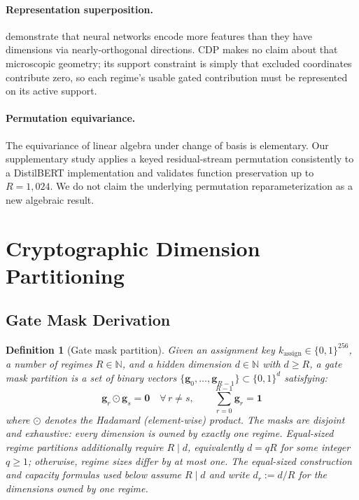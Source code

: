 \documentclass[11pt,a4paper]{article}
\newtheorem{definition}{Definition}
\newcommand{\N}{\mathbb{N}}
\newcommand{\bg}{\mathbf{g}}
\begin{document}
\paragraph{Representation superposition.}
\citet{elhage2022superposition} demonstrate that neural networks
encode more features than they have dimensions via nearly-orthogonal
directions.  CDP makes no claim about that microscopic geometry; its
support constraint is simply that excluded coordinates contribute
zero, so each regime's usable gated contribution must be represented
on its active support.

\paragraph{Permutation equivariance.}
The equivariance of linear algebra under change of basis is
elementary.  Our supplementary study applies a keyed residual-stream
permutation consistently to a DistilBERT implementation and validates
function preservation up to $R{=}1{,}024$.  We do not claim the
underlying permutation reparameterization as a new algebraic result.

\section{Cryptographic Dimension Partitioning}
\label{sec:cdp}

\subsection{Gate Mask Derivation}
\label{sec:gate-derivation}

\begin{definition}[Gate mask partition]
\label{def:gate-partition}
Given an assignment key $k_{\mathrm{assign}} \in \{0,1\}^{256}$,
a number of regimes
$R \in \N$, and a hidden dimension $d \in \N$ with $d \geq R$,
a \emph{gate mask partition} is a set of binary vectors
$\{\bg_0, \ldots, \bg_{R-1}\} \subset \{0,1\}^d$ satisfying:
\begin{equation}
\bg_r \odot \bg_s = \mathbf{0} \quad \forall\, r \neq s, \qquad
\sum_{r=0}^{R-1} \bg_r = \mathbf{1}
\label{eq:mask-properties}
\end{equation}
where $\odot$ denotes the Hadamard (element-wise) product.  The
masks are disjoint and exhaustive: every dimension is owned by
exactly one regime.  Equal-sized regime partitions additionally
require $R \mid d$, equivalently $d = qR$ for some integer
$q \geq 1$; otherwise, regime sizes differ by at most one.  The
equal-sized construction and capacity formulas used below assume
$R \mid d$ and write $d_r := d/R$ for the dimensions owned by one
regime.
\end{definition}
\end{document}
